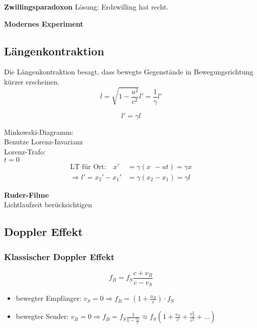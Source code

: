 \documentclass[titlepage,11pt,a4paper,ngerman]{report}
\newcommand{\tx}[1]{\textrm{#1}}
\newcommand{\lcom}[1]{\color{MidnightBlue}#1\color{black}}
\newcommand{\frbox}[2]{\begin{tcolorbox}[colback=white,colframe=red!75!black,fonttitle=\bfseries,title=#1]#2\end{tcolorbox}}
\begin{document}
\textbf{Zwillingsparadoxon}
Lösung: \lcom{Erdzwilling hat recht.}

\textbf{Modernes Experiment}






\subsection{Längenkontraktion}
Die Längenkontraktion besagt, dass bewegte Gegenstände in Bewegungsrichtung kürzer erscheinen.
\begin{equation*}
l = \sqrt{1 - \frac{u^2}{c^2}} l' = \frac{1}{\gamma} l'
\end{equation*}
\frbox{Längenkontraktion}{\begin{equation*}
	l' = \gamma l
	\end{equation*}}
Minkowski-Diagramm:\\[5pt]
Benutze Lorenz-Invarianz\\
Lorenz-Trafo:\\
$ t = 0 $
\begin{align*}
\tx{LT für Ort:} \quad x' &= \gamma(x\phantom{_2} - ut) = \gamma x\\
\Rightarrow l' = x_2' - x_1' &= \gamma (x_2 - x_1) = \gamma l
\end{align*}






\textbf{Ruder-Filme}\\
Lichtlaufzeit berücksichtigen

\subsection{Doppler Effekt}
\subsubsection{Klassischer Doppler Effekt}
\begin{equation*}
f_B = f_S \frac{c + v_B}{c - v_S}
\end{equation*}
\begin{itemize}
	\item bewegter Empfänger: $ v_S = 0 \Rightarrow f_B = \left(1 + \frac{u_B}{c}\right) \cdot f_S $
	\item bewegter Sender: $ v_B = 0 \Rightarrow f_B = f_S \frac{1}{1 - \frac{v_S}{c}} \approx f_S \left(1 + \frac{v_S}{c} + \frac{v_S^2}{c^2} + \dots \right) $
\end{itemize}
\end{document}
